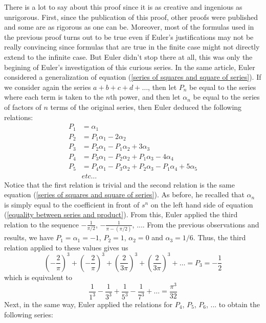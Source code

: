 There is a lot to say about this proof since it is as creative and ingenious as unrigorous. First, since the publication of this proof, other proofs were published and some are as rigorous as one can be. Moreover, most of the formulas used in the previous proof turns out to be true even if Euler's justifications may not be really convincing since formulas that are true in the finite case might not directly extend to the infinite case. But Euler didn't stop there at all, this was only the begining of Euler's investigation of this curious series. In the same article, Euler considered a generalization of equation (\ref{series of squares and square of series}). If we consider again the series $a + b + c + d + \dots$, then let $P_n$ be equal to the series where each term is taken to the $n$th power, and then let $\alpha_n$ be equal to the series of factors of $n$ terms of the original series, then Euler deduced the following relations:
\begin{align*}
    P_1 &= \alpha_1 \\
    P_2 &= P_1 \alpha_1 - 2 \alpha_2 \\
    P_3 &= P_2 \alpha_1 - P_1 \alpha_2 + 3\alpha_3 \\
    P_4 &= P_3 \alpha_1 - P_2 \alpha_2 + P_1 \alpha_3 - 4\alpha_4 \\ 
    P_5 &= P_4 \alpha_1 - P_3 \alpha_2 + P_2 \alpha_3 - P_1 \alpha_4 + 5\alpha_5 \\
    & etc \dots 
\end{align*}
Notice that the first relation is trivial and the second relation is the same equation (\ref{series of squares and square of series}). As before, he recalled that $\alpha_n$ is simply equal to the coefficient in front of $s^n$ on the left hand side of equation (\ref{equality between series and product}). From this, Euler applied the third relation to the sequence $-\frac{1}{\pi/2}$, $-\frac{1}{\pi - (\pi/2)}$, .... From the previous observations and results, we have $P_1 = \alpha_1 =  -1$, $P_2 = 1$, $\alpha_2 = 0$ and $\alpha_3 = 1/6$. Thus, the third relation applied to these values gives us
$$\left(-\frac{2}{\pi}\right)^3 + \left(-\frac{2}{\pi}\right)^3 + \left(\frac{2}{3\pi}\right)^3 + \left(\frac{2}{3\pi}\right)^3 + \dots = P_3 = -\frac{1}{2}$$
which is equivalent to
\begin{equation} \label{closely zeta-3}
    \frac{1}{1^3} - \frac{1}{3^3} + \frac{1}{5^3} - \frac{1}{7^3} + \dots = \frac{\pi^3}{32}
\end{equation}
Next, in the same way, Euler applied the relations for $P_4$, $P_5$, $P_6$, ... to obtain the following series:
